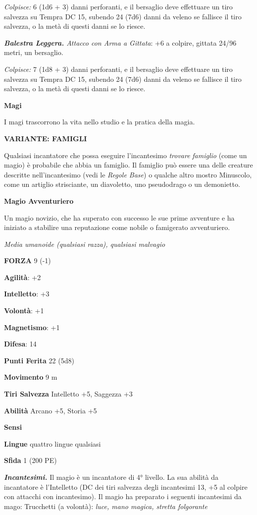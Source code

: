 \begin{multicols}{2}
\emph{Colpisce:} 6 (1d6 + 3) danni perforanti, e il bersaglio deve
effettuare un tiro salvezza su Tempra DC 15, subendo 24 (7d6)
danni da veleno se fallisce il tiro salvezza, o la metà di questi danni
se lo riesce.

\emph{\textbf{Balestra Leggera.} Attacco con Arma a Gittata}: +6 a
colpire, gittata 24/96 metri, un bersaglio.

\emph{Colpisce:} 7 (1d8 + 3) danni perforanti, e il bersaglio deve
effettuare un tiro salvezza su Tempra DC 15, subendo 24 (7d6)
danni da veleno se fallisce il tiro salvezza, o la metà di questi danni
se lo riesce.

\textbf{Magi}

I magi trascorrono la vita nello studio e la pratica della magia.

\textbf{VARIANTE: FAMIGLI}

Qualsiasi incantatore che possa eseguire l'incantesimo \emph{trovare}
\emph{famiglio} (come un magio) è probabile che abbia un famiglio. Il
famiglio può essere una delle creature descritte nell'incantesimo (vedi
le \emph{Regole Base}) o qualche altro mostro Minuscolo, come un
artiglio strisciante, un diavoletto, uno pseudodrago o un demonietto.

\textbf{Magio Avventuriero}

Un magio novizio, che ha superato con successo le sue prime avventure e
ha iniziato a stabilire una reputazione come nobile o famigerato
avventuriero.

\emph{Media umanoide (qualsiasi razza), qualsiasi malvagio}

\textbf{FORZA} 9 (-1)

\textbf{Agilità}: +2

\textbf{Intelletto}: +3

\textbf{Volontà}: +1

\textbf{Magnetismo}: +1

\textbf{Difesa}: 14

\textbf{Punti Ferita} 22 (5d8)

\textbf{Movimento} 9 m

\textbf{Tiri Salvezza} Intelletto +5, Saggezza +3

\textbf{Abilità} Arcano +5, Storia +5

\textbf{Sensi} 

\textbf{Lingue} quattro lingue qualsiasi

\textbf{Sfida} 1 (200 PE)

\emph{\textbf{Incantesimi.}} Il magio è un incantatore di 4° livello. La
sua abilità da incantatore è l'Intelletto (DC dei tiri salvezza degli
incantesimi 13, +5 al colpire con attacchi con incantesimo). Il magio ha
preparato i seguenti incantesimi da mago: Trucchetti (a volontà):
\emph{luce, mano magica, stretta folgorante}


\end{multicols}
